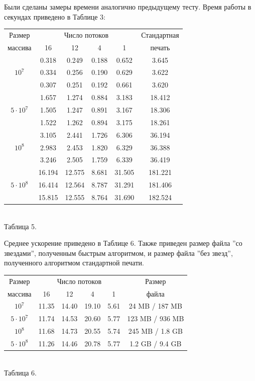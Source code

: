 Были сделаны замеры времени аналогично предыдущему тесту.
Время работы в секундах приведено в Таблице 3:
\begin{center}
\begin{tabular}{||c|c|c|c|c|c||}
\hline
\hline
Размер & \multicolumn{4}{c|}{Число потоков} & Стандартная\\
\hhline{~|-|-|-|-|~|}
массива & 16 & 12 & 4 & 1 & печать \\
\hline
\hline
& 0.318 & 0.249 & 0.188 & 0.652 & 3.645 \\
\hhline{~|-|-|-|-|-|}
$10^7$ & 0.334 & 0.256 & 0.190 & 0.629 & 3.622 \\
\hhline{~|-|-|-|-|-|}
& 0.307 & 0.251 & 0.192 & 0.661 & 3.620 \\
\hline
& 1.657 & 1.274 & 0.884 & 3.183 & 18.412 \\
\hhline{~|-|-|-|-|-|}
$5 \cdot 10^7$ & 1.505 & 1.247 & 0.891 & 3.167 & 18.306 \\
\hhline{~|-|-|-|-|-|}
& 1.522 & 1.262 & 0.894 & 3.175 & 18.261 \\
\hline
& 3.105 & 2.441 & 1.726 & 6.306 & 36.194 \\
\hhline{~|-|-|-|-|-|}
$10^8$ & 2.983 & 2.453 & 1.820 & 6.329 & 36.388 \\
\hhline{~|-|-|-|-|-|}
& 3.246 & 2.505 & 1.759 & 6.339 &  36.419 \\
\hline
& 16.194 & 12.575 & 8.681 & 31.505 & 181.221 \\
\hhline{~|-|-|-|-|-|}
$5 \cdot 10^8$ & 16.414 & 12.564 & 8.787 & 31.291 & 181.406 \\
\hhline{~|-|-|-|-|-|}
& 15.815 & 12.555  & 8.764 & 31.690 & 182.524 \\
\hline
\hline
\end{tabular}
\\\vspace{10pt}
\small{Таблица 5.}
\end{center}
Среднее ускорение приведено в Таблице 6.
Также приведен размер файла ''со звездами'', полученным быстрым алгоритмом, и размер файла ''без звезд'', полученного алгоритмом стандартной печати.

\begin{center}
\begin{tabular}{||c|c|c|c|c|c||}
\hline
\hline
Размер & \multicolumn{4}{c|}{Число потоков} & Размер\\
\hhline{~|-|-|-|-|~|}
массива & 16 & 12 & 4 & 1 & файла \\
\hline
$10^7$  & 11.35 & 14.40 & 19.10 & 5.61 & 24 MB / 187 MB \\
\hline
$5 \cdot 10^7$ &11.74 & 14.53 & 20.60 & 5.77 & 123 MB / 936 MB\\
\hline
$10^8$ &11.68 & 14.73 & 20.55 & 5.74 & 245 MB / 1.8 GB \\
\hline
$5 \cdot 10^8$ &11.26 & 14.46 & 20.78 & 5.77 & 1.2 GB / 9.4 GB\\
\hline
\hline
\end{tabular}
\\\vspace{10pt}
\small{Таблица 6.}
\end{center}

